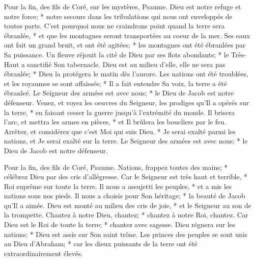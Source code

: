 Pour la fin, des fils de Coré, sur les mystères, Psaume.
Dieu est notre refuge et notre force; * notre secours dans les tribulations qui nous ont enveloppés de toutes parts.
C'est pourquoi nous ne craindrons point quand la terre sera ébranlée, * et que les montagnes seront transportées au coeur de la mer.
Ses eaux ont fait un grand bruit, et ont été agitées; * les montagnes ont été ébranlées par Sa puissance.
Un fleuve réjouit la cité de Dieu par ses flots abondants; * le Très-Haut a sanctifié Son tabernacle.
Dieu est au milieu d'elle, elle ne sera pas ébranlée; * Dieu la protégera le matin dès l'aurore.
Les nations ont été troublées, et les royaumes se sont affaissés; * Il a fait entendre Sa voix, la terre a été ébranleé.
Le Seigneur des armées est avec nous; * le Dieu de Jacob est notre défenseur.
Venez, et voyez les oeuvres du Seigneur, les prodiges qu'Il a opérés sur la terre, *
en faisant cesser la guerre jusqu'à l'extrémité du monde. Il brisera l'arc, et mettra les armes en pièces, * et Il brûlera les boucliers par le feu.
Arrêtez, et considérez que c'est Moi qui suis Dieu. * Je serai exalté parmi les nations, et Je serai exalté sur la terre.
Le Seigneur des armées est avec nous; * le Dieu de Jacob est notre défenseur.

Pour la fin, des fils de Coré, Psaume.
Nations, frappez toutes des mains; * célébrez Dieu par des cris d'allégresse.
Car le Seigneur est très haut et terrible, * Roi suprême sur toute la terre.
Il nous a assujetti les peuples, * et a mis les nations sous nos pieds.
Il nous a choisis pour Son héritage; * la beauté de Jacob qu'Il a aimée.
Dieu est monté au milieu des cris de joie, * et le Seigneur au son de la trompette.
Chantez à notre Dieu, chantez; * chantez à notre Roi, chantez.
Car Dieu est le Roi de toute la terre; * chantez avec sagesse.
Dieu régnera sur les nations; * Dieu est assis sur Son saint trône.
Les princes des peuples se sont unis au Dieu d'Abraham; * car les dieux puissants de la terre ont été extraordinairement élevés.

